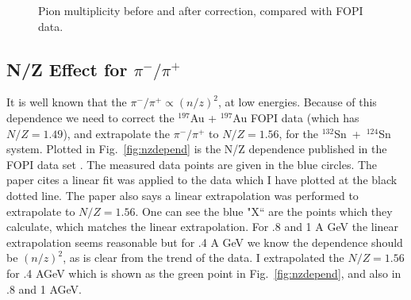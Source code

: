 \documentclass[12pt, letterpaper, twoside]{article}
\begin{document}
\begin{figure}[!hbt]

\begin{adjustbox}{max width=\linewidth,center}
\centering
{}%
%
\end{adjustbox}
\caption{Pion multiplicity before and after correction, compared with FOPI data.}
\label{fig:mult}

\end{figure}

\subsection{N/Z Effect for $\pi^-/\pi^+$}
It is well known that the $\pi^-/\pi^+ \propto (n/z)^2$, at low energies. Because of this dependence we need to correct the ${}^{197}$Au + ${}^{197}$Au FOPI data (which has $N/Z= 1.49$), and extrapolate the  $\pi^-/\pi^+$ to $N/Z=1.56$, for the ${}^{132}$Sn~+~${}^{124}$Sn system. Plotted in Fig.~\ref{fig:nzdepend} is the N/Z dependence published in the FOPI data set \cite{fopi}. The measured data points are given in the blue circles. The paper cites a linear fit was applied to the data which I have plotted at the black dotted line. The paper also says a linear extrapolation was performed to extrapolate to $N/Z=1.56$. One can see the blue "X`` are the points which they calculate, which matches the linear extrapolation. For .8 and 1 A GeV the linear extrapolation seems reasonable but for .4 A GeV we know the dependence should be $(n/z)^2$, as is clear from the trend of the data. I extrapolated the $N/Z=1.56$ for .4 AGeV which is shown as the green point in Fig.~\ref{fig:nzdepend}, and also in .8 and 1 AGeV. 
\end{document}
